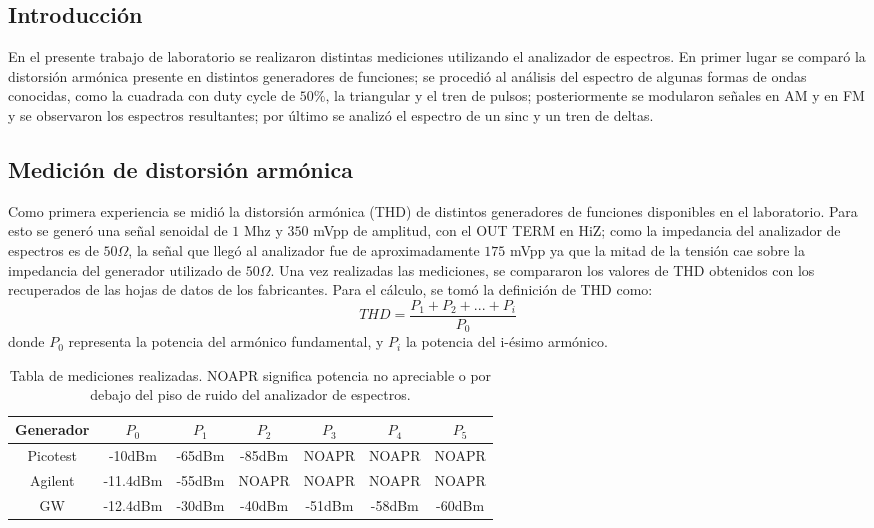 \subsection{Introducción}

En el presente trabajo de laboratorio se realizaron distintas mediciones utilizando el analizador de espectros. En primer lugar se comparó la distorsión armónica presente en distintos generadores de funciones; se procedió al análisis del espectro de algunas formas de ondas conocidas, como la cuadrada con duty cycle de $50\%$, la triangular y el tren de pulsos; posteriormente se modularon señales en AM y en FM y se observaron los espectros resultantes; por último se analizó el espectro de un sinc y un tren de deltas.

\subsection{Medición de distorsión armónica}
Como primera experiencia se midió la distorsión armónica (THD) de distintos generadores de funciones disponibles en el laboratorio. Para esto se generó una señal senoidal de $1$ Mhz y $350$ mVpp de amplitud, con el OUT TERM en HiZ; como la impedancia del analizador de espectros es de $50 \Omega$, la señal que llegó al analizador fue de aproximadamente $175$ mVpp ya que la mitad de la tensión cae sobre la impedancia del generador utilizado de $50 \Omega$. Una vez realizadas las mediciones, se compararon los valores de THD obtenidos con los recuperados de las hojas de datos de los fabricantes. Para el cálculo, se tomó la definición de THD como:
\begin{equation}
    THD=\frac{P_1+P_2+...+P_i}{P_0}
    \label{eq:THD}
\end{equation}
donde $P_0$ representa la potencia del armónico fundamental, y $P_i$ la potencia del i-ésimo armónico.

\begin{table}[H]
\centering
\begin{tabular}{@{}ccccccc@{}}
\toprule
\textbf{Generador} & $P_0$ & $P_1$ & $P_2$ & $P_3$ & $P_4$ & $P_5$ \\ \midrule
Picotest & -10dBm & -65dBm & -85dBm & NOAPR & NOAPR & NOAPR \\
Agilent & -11.4dBm & -55dBm & NOAPR & NOAPR & NOAPR & NOAPR \\
GW & -12.4dBm & -30dBm & -40dBm & -51dBm & -58dBm & -60dBm \\ \bottomrule
\end{tabular}
\caption{Tabla de mediciones realizadas. NOAPR significa potencia no apreciable o por debajo del piso de ruido del analizador de espectros.}
\end{table}


